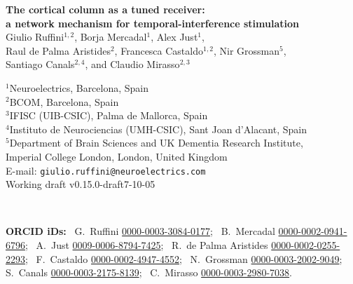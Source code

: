\documentclass[11pt,a4paper]{article}
\newif\ifjne
\newcommand{\paperver}{0.15.0-draft7} %
\begin{document}
\ifjne
\begin{center}
{\LARGE\bfseries The cortical column as a tuned receiver:\\[4pt]
a network mechanism for temporal-interference stimulation}\\[16pt]
{\large Giulio Ruffini$^{1,2}$, Borja Mercadal$^{1}$, Alex Just$^{1}$,\\[2pt]
Raul de Palma Aristides$^{2}$, Francesca Castaldo$^{1,2}$, Nir Grossman$^{5}$,\\[2pt]
Santiago Canals$^{2,4}$, and Claudio Mirasso$^{2,3}$}\\[12pt]
\begin{minipage}{0.86\textwidth}\centering\small
$^{1}$Neuroelectrics, Barcelona, Spain\\
$^{2}$BCOM, Barcelona, Spain\\
$^{3}$IFISC (UIB-CSIC), Palma de Mallorca, Spain\\
$^{4}$Instituto de Neurociencias (UMH-CSIC), Sant Joan d'Alacant, Spain\\
$^{5}$Department of Brain Sciences and UK Dementia Research Institute,\\
Imperial College London, London, United Kingdom\\[6pt]
E-mail: \texttt{giulio.ruffini@neuroelectrics.com}\\[4pt]
Working draft v\paperver{}-10-05
\end{minipage}\\[8pt]
\begin{minipage}{0.86\textwidth}\centering\footnotesize\color{negray}
\textbf{ORCID iDs:}\ %
G.~Ruffini \href{https://orcid.org/0000-0003-3084-0177}{0000-0003-3084-0177};\ %
B.~Mercadal \href{https://orcid.org/0000-0002-0941-6796}{0000-0002-0941-6796};\ %
A.~Just \href{https://orcid.org/0009-0006-8794-7425}{0009-0006-8794-7425};\ %
R.~de Palma Aristides \href{https://orcid.org/0000-0002-0255-2293}{0000-0002-0255-2293};\ %
F.~Castaldo \href{https://orcid.org/0000-0002-4947-4552}{0000-0002-4947-4552};\ %
N.~Grossman \href{https://orcid.org/0000-0003-2002-9049}{0000-0003-2002-9049};\ %
S.~Canals \href{https://orcid.org/0000-0003-2175-8139}{0000-0003-2175-8139};\ %
C.~Mirasso \href{https://orcid.org/0000-0003-2980-7038}{0000-0003-2980-7038}.
\end{minipage}
\end{center}
\end{document}

